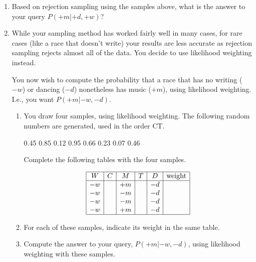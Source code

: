 \documentclass[12pt]{article}
\begin{document}
\begin{enumerate}

\item Based on rejection sampling using the samples above, what is the
  answer to your query $P(+m | +d, +w)$?

\item While your sampling method has worked fairly well in many cases,
  for rare cases (like a race that doesn't write) your results
  are less accurate as rejection sampling rejects almost all of the
  data.  You decide to use likelihood weighting instead.

You now wish to compute the probability that a race that has no
writing ($-w$) or dancing ($-d$) nonetheless has music ($+m$), using
likelihood weighting. I.e., you want $P(+m | -w, -d)$.

\begin{enumerate}

\item You draw four samples, using likelihood weighting.  The
  following random numbers are generated, used in the order CT.

\begin{center}
0.45 0.85 0.12 0.95 0.66 0.23 0.07 0.46 
\end{center}

Complete the following tables with the four samples.

$$\begin{array}{|c|c|c|c|c|c|} \hline
W  & C  & M  & T  & D  & \hbox{weight} \\ \hline
-w &    & +m &    & -d & \\
-w &    & -m &    & -d & \\
-w &    & -m &    & -d & \\
-w &    & +m &    & -d & \\ \hline
\end{array}$$

\item For each of these samples, indicate its weight in the same table.

\item Compute the answer to your query, $P(+m | -w, -d)$, using
  likelihood weighting with these samples.

\end{enumerate}

\end{enumerate}
\end{document}
